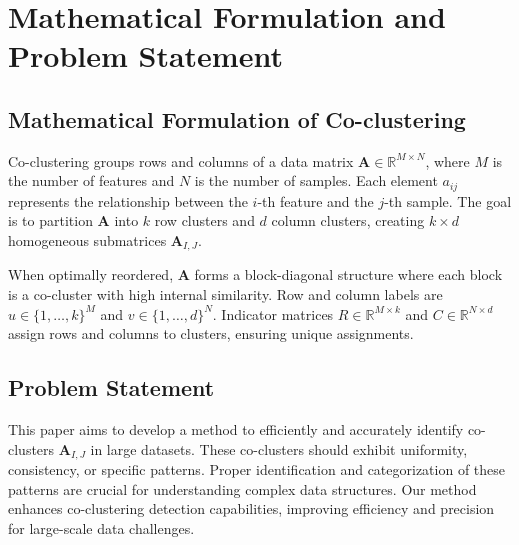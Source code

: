 
\section{Mathematical Formulation and Problem Statement}\label{sec:formula}

\subsection{Mathematical Formulation of Co-clustering}
Co-clustering groups rows and columns of a data matrix $\mathbf{A} \in \mathbb{R}^{M \times N}$, where $M$ is the number of features and $N$ is the number of samples. Each element $a_{ij}$ represents the relationship between the $i$-th feature and the $j$-th sample. The goal is to partition $\mathbf{A}$ into $k$ row clusters and $d$ column clusters, creating $k \times d$ homogeneous submatrices $\mathbf{A}_{I, J}$.

When optimally reordered, $\mathbf{A}$ forms a block-diagonal structure where each block is a co-cluster with high internal similarity. Row and column labels are \( u \in \{1,\dots,k\}^M \) and \( v \in \{1,\dots,d\}^N \). Indicator matrices \( R \in \mathbb{R}^{M \times k} \) and \( C \in \mathbb{R}^{N \times d} \) assign rows and columns to clusters, ensuring unique assignments.

\subsection{Problem Statement}
This paper aims to develop a method to efficiently and accurately identify co-clusters $\mathbf{A}_{I, J}$ in large datasets. These co-clusters should exhibit uniformity, consistency, or specific patterns. Proper identification and categorization of these patterns are crucial for understanding complex data structures. Our method enhances co-clustering detection capabilities, improving efficiency and precision for large-scale data challenges.


